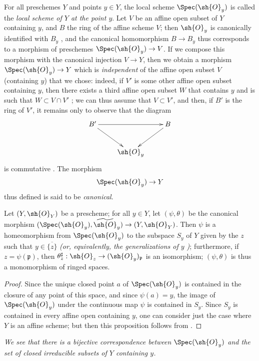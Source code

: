 For all preschemes $Y$ and points $y\in Y$, the local scheme $\Spec(\sh{O}_y)$
is called the \emph{local scheme of $Y$ at the point $y$}.
Let $V$ be an affine open subset of $Y$ containing $y$, and $B$ the ring of the affine scheme $V$;
then $\sh{O}_y$ is canonically identified with $B_y$ , and the canonical homomorphism $B\to B_y$ thus corresponds  to a morphism of preschemes $\Spec(\sh{O}_y)\to V$.
If we compose this morphism with the canonical injection $V\to Y$, then we obtain a morphism $\Spec(\sh{O}_y)\to Y$ which is \emph{independent} of the affine open subset $V$ (containing $y$) that we chose: indeed, if $V'$ is some other affine open subset containing $y$, then there exists a third affine open subset $W$ that contains $y$ and is such that $W\subset V\cap V'$ ;
we can thus assume that $V\subset V'$, and then, if $B'$ is the ring of $V'$, it remains only to observe that the diagram
\[
  \xymatrix{
    B'\ar[rr]\ar[dr] & &
    B\ar[dl]\\
    & \sh{O}_y
  }
\]
is commutative .
The morphism
\[
  \Spec(\sh{O}_y)\to Y
\]
thus defined is said to be {\it canonical}.

\begin{proposition}[2.4.2]
\label{I.2.4.2}
Let $(Y,\sh{O}_Y)$ be a prescheme;
for all $y\in Y$, let $(\psi,\theta)$ be the canonical morphism $(\Spec(\sh{O}_y),\widetilde{\sh{O}}_y)\to(Y,\sh{O}_Y)$.
Then $\psi$ is a homeomorphism from $\Spec(\sh{O}_y)$ to the subspace $S_y$ of $Y$ given by the $z$ such that $y\in\overline{\{z\}}$ \emph{(or, equivalently, the \emph{generalizations} of $y$ )};
furthermore, if $z=\psi(\mathfrak{p})$, then $\theta_z^\sharp:\sh{O}_z\to(\sh{O}_y)_\mathfrak{p}$ is an isomorphism;
$(\psi,\theta)$ is thus a monomorphism of ringed spaces.
\end{proposition}

\begin{proof}
Since the unique closed point $a$ of $\Spec(\sh{O}_y)$ is contained in the closure of any point of this space, and since $\psi(a)=y$, the image of $\Spec(\sh{O}_y)$ under the continuous map $\psi$ is contained in $S_y$.
Since $S_y$ is contained in every affine open containing $y$, one can consider just the case where $Y$ is an affine scheme;
but then this proposition follows from .
\end{proof}

\emph{We see  that there is a bijective correspondence between $\Spec(\sh{O}_y)$ and the set of closed irreducible subsets of $Y$ containing $y$.}

